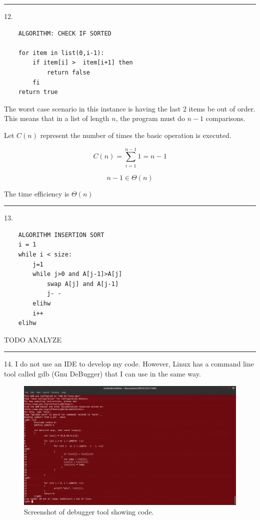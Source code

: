 \documentclass{article}
\begin{document}
\noindent\rule{8cm}{0.4pt}


12. 

\begin{lstlisting}
	ALGORITHM: CHECK IF SORTED

	for item in list(0,i-1):
		if item[i] >  item[i+1] then
			return false
		fi
	return true
\end{lstlisting}

The worst case scenario in this instance is having the last 2 items be out of order. This means that in a list of length $n$, the program must do $n-1$ comparisons. 

Let $C(n)$ represent the number of times the basic operation is executed. 

\[ C(n) = \sum_{i=1}^{n-1} 1 = n-1 \]


\[ n-1 \in \Theta(n)  \]

The time efficiency is $\Theta(n)$


\noindent\rule{8cm}{0.4pt}



13. 

\begin{lstlisting}
	ALGORITHM INSERTION SORT
	i = 1
	while i < size:
		j=1
		while j>0 and A[j-1]>A[j]
			swap A[j] and A[j-1]
			j- - 
		elihw
		i++
	elihw
\end{lstlisting}

TODO ANALYZE

\noindent\rule{8cm}{0.4pt}


14. I do not use an IDE to develop my code. However, Linux has a command line tool called gdb (Gnu DeBugger) that I can use in the same way. 


\begin{figure}[H]

  \includegraphics[scale=0.4]{P15-1}
  \caption{Screenshot of debugger tool showing code.}
\end{figure}
\end{document}
